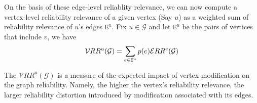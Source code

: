 On the basis of these edge-level reliablity relevance, we can now compute a vertex-level reliability relevance of a given vertex (Say $u$) as a weighted sum of reliability relevance of $u$'s edges $\mathtt{E}^{u}$.  
Fix $u \in \mathcal{G}$ and let $\mathtt{E}^{u}$ be the pairs of vertices that include $v$, we have 
\begin{equation*}
    \vspace{-0.5em}
    \mathcal{V}RR^{u}(\mathcal{G})=\sum_{e \in \mathtt{E}^{u}} p(e)  \mathcal{E}RR^{e}(\mathcal{G})
    \vspace{0.5em}
\end{equation*}

The $\mathcal{V}RR^{u}(\mathcal{G})$  is a measure of the expected impact of vertex modification on the graph reliability. Namely, the higher the vertex's reliability relevance, the larger reliability distortion introduced by modification associated with its edges.

